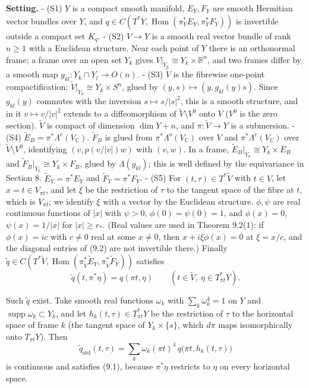 \documentclass[
  11pt,
]{article}
\begin{document}
\textbf{Setting.} - (S1) \(Y\) is a compact smooth manifold, \(E_Y,F_Y\)
are smooth Hermitian vector bundles over \(Y\), and
\(q\in C(T^*Y,\operatorname{Hom}(\pi_Y^*E_Y,\pi_Y^*F_Y))\) is invertible
outside a compact set \(K_q\). - (S2) \(V\to Y\) is a smooth real vector
bundle of rank \(n\ge1\) with a Euclidean structure. Near each point of
\(Y\) there is an orthonormal frame; a frame over an open set \(Y_k\)
gives \(V|_{Y_k}\cong Y_k\times\mathbb R^n\), and two frames differ by a
smooth map \(g_{kl}:Y_k\cap Y_l\to O(n)\). - (S3) \(\tilde V\) is the
fibrewise one-point compactification:
\(\tilde V|_{Y_k}\cong Y_k\times S^n\), glued by
\((y,s)\mapsto(y,g_{kl}(y)s)\). Since \(g_{kl}(y)\) commutes with the
inversion \(s\mapsto s/|s|^2\), this is a smooth structure, and in it
\(v\mapsto v/|v|^2\) extends to a diffeomorphism of
\(\tilde V\setminus V^0\) onto \(V\) (\(V^0\) is the zero section).
\(\tilde V\) is compact of dimension \(\dim Y+n\), and
\(\pi:\tilde V\to Y\) is a submersion. - (S4)
\(\tilde E_B=\pi^*\Lambda^e(V_{\mathbb C})\). \(\tilde F_B\) is glued
from \(\pi^*\Lambda^o(V_{\mathbb C})\) over \(V\) and
\(\pi^*\Lambda^e(V_{\mathbb C})\) over \(\tilde V\setminus V^0\),
identifying \((v,p(v/|v|)w)\) with \((v,w)\). In a frame,
\(\tilde E_B|_{Y_k}\cong Y_k\times E_B\) and
\(\tilde F_B|_{Y_k}\cong Y_k\times F_B\), glued by \(\Lambda(g_{kl})\);
this is well defined by the equivariance in Section 8.
\(\tilde E_Y=\pi^*E_Y\) and \(\tilde F_Y=\pi^*F_Y\). - (S5) For
\((t,\tau)\in T^*\tilde V\) with \(t\in V\), let \(x=t\in V_{\pi t}\),
and let \(\xi\) be the restriction of \(\tau\) to the tangent space of
the fibre at \(t\), which is \(V_{\pi t}\); we identify \(\xi\) with a
vector by the Euclidean structure. \(\phi,\psi\) are real continuous
functions of \(|x|\) with \(\psi>0\), \(\phi(0)=\psi(0)=1\), and
\(\phi(x)=0\), \(\psi(x)=1/|x|\) for \(|x|\ge r_*\). (Real values are
used in Theorem 9.2(1): if \(\phi(x)=ic\) with \(c\ne0\) real at some
\(x\ne0\), then \(x+i\xi\phi(x)=0\) at \(\xi=x/c\), and the diagonal
entries of (9.2) are not invertible there.) Finally
\(\tilde q\in C(T^*\tilde V,\operatorname{Hom}(\pi_{\tilde V}^*\tilde E_Y,\pi_{\tilde V}^*\tilde F_Y))\)
satisfies \[
\tilde q(t,\pi^*\eta)=q(\pi t,\eta)\qquad(t\in\tilde V,\ \eta\in T^*_{\pi t}Y).
\tag{9.1}
\]

Such \(\tilde q\) exist. Take smooth real functions \(\omega_k\) with
\(\sum_k\omega_k^4=1\) on \(Y\) and
\(\operatorname{supp}\omega_k\subset Y_k\), and let
\(h_k(t,\tau)\in T^*_{\pi t}Y\) be the restriction of \(\tau\) to the
horizontal space of frame \(k\) (the tangent space of
\(Y_k\times\{s\}\), which \(d\pi\) maps isomorphically onto
\(T_{\pi t}Y\)). Then \[
\tilde q_{\mathrm{std}}(t,\tau)=\sum_k\omega_k(\pi t)^4\,q\bigl(\pi t,h_k(t,\tau)\bigr)
\] is continuous and satisfies (9.1), because \(\pi^*\eta\) restricts to
\(\eta\) on every horizontal space.
\end{document}
